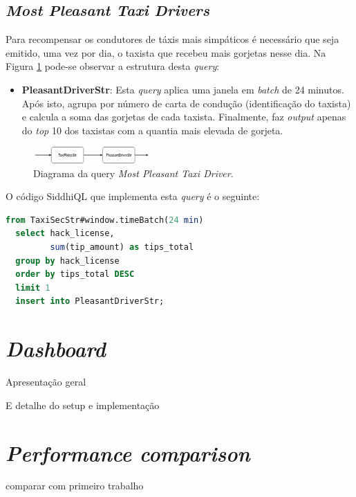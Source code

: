 \documentclass[article]{IEEEtran}
\begin{document}
\subsection{\textit{Most Pleasant Taxi Drivers}}

Para recompensar os condutores de táxis mais simpáticos é necessário que seja emitido, uma vez por dia, o taxista que recebeu mais gorjetas nesse dia.
Na Figura \ref{fig:pleasantDriverDiagram} pode-se observar a estrutura desta \textit{query}:
\begin{itemize}
    \item \textbf{PleasantDriverStr}: Esta \textit{query} aplica uma janela em \textit{batch} de 24 minutos. Após isto, agrupa por número de carta de condução (identificação do taxista) e calcula a soma das gorjetas de cada taxista. Finalmente, faz \textit{output} apenas do \textit{top} 10 dos taxistas com a quantia mais elevada de gorjeta. 
\end{itemize} 

\begin{figure}[hbtp]
    \centering
    \includegraphics[width=0.4\textwidth]{images/pleasantDriver}
    \caption{Diagrama da query \textit{Most Pleasant Taxi Driver}.}
    \label{fig:pleasantDriverDiagram}
\end{figure}

O código SiddhiQL que implementa esta \textit{query} é o seguinte:

\begin{lstlisting}[language=SQL]
  from TaxiSecStr#window.timeBatch(24 min)
  select hack_license,
         sum(tip_amount) as tips_total
  group by hack_license
  order by tips_total DESC
  limit 1
  insert into PleasantDriverStr;
\end{lstlisting}

\section{\textit{Dashboard}} 
		Apresentação geral
		
		E detalhe do setup e implementação 
		
\section{\textit{Performance comparison}} 
comparar com primeiro trabalho
		
\end{document}
